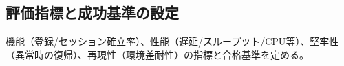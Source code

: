 \subsection{評価指標と成功基準の設定}
機能（登録/セッション確立率）、性能（遅延/スループット/CPU等）、堅牢性（異常時の復帰）、再現性（環境差耐性）の指標と合格基準を定める。
















